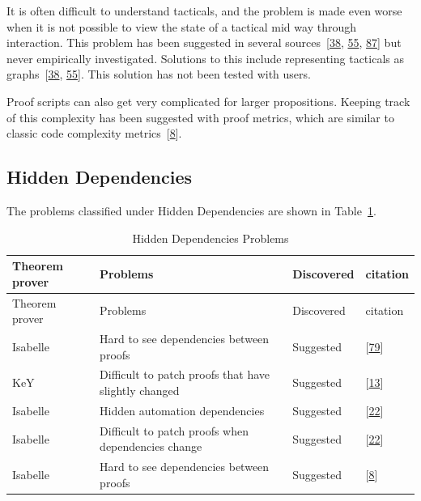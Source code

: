 \documentclass[
]{article}
\begin{document}
It is often difficult to understand tacticals, and the problem is made
even worse when it is not possible to view the state of a tactical mid
way through interaction. This problem has been suggested in several
sources~{[}\protect\hyperlink{ref-grov_tinker_2018}{38},
\protect\hyperlink{ref-lin_understanding_2016}{55},
\protect\hyperlink{ref-zacchiroli_user_2007}{87}{]} but never
empirically investigated. Solutions to this include representing
tacticals as graphs~{[}\protect\hyperlink{ref-grov_tinker_2018}{38},
\protect\hyperlink{ref-lin_understanding_2016}{55}{]}. This solution has
not been tested with users.

Proof scripts can also get very complicated for larger propositions.
Keeping track of this complexity has been suggested with proof metrics,
which are similar to classic code complexity
metrics~{[}\protect\hyperlink{ref-aspinall_towards_2016}{8}{]}.

\hypertarget{hidden-dependencies}{%
\subsection{Hidden Dependencies}\label{hidden-dependencies}}

The problems classified under Hidden Dependencies are shown in
Table~\ref{tbl:hidden_dependencies}.

\hypertarget{tbl:hidden_dependencies}{}
\begin{longtable}[]{@{}llll@{}}
\caption{\label{tbl:hidden_dependencies}Hidden Dependencies
Problems}\tabularnewline
\toprule
Theorem prover & Problems & Discovered & citation \\
\midrule
\endfirsthead
\toprule
Theorem prover & Problems & Discovered & citation \\
\midrule
\endhead
Isabelle & Hard to see dependencies between proofs & Suggested &
{[}\protect\hyperlink{ref-spichkova_human-centred_2017}{79}{]} \\
KeY & Difficult to patch proofs that have slightly changed & Suggested &
{[}\protect\hyperlink{ref-beckert_evaluating_2012}{13}{]} \\
Isabelle & Hidden automation dependencies & Suggested &
{[}\protect\hyperlink{ref-bourke_challenges_2012}{22}{]} \\
Isabelle & Difficult to patch proofs when dependencies change &
Suggested & {[}\protect\hyperlink{ref-bourke_challenges_2012}{22}{]} \\
Isabelle & Hard to see dependencies between proofs & Suggested &
{[}\protect\hyperlink{ref-aspinall_towards_2016}{8}{]} \\
\bottomrule
\end{longtable}
\end{document}
